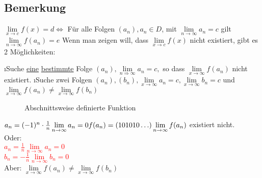 \subsection*{Bemerkung}
$\lim\limits_{x \rightarrow c} f(x) = d \Leftrightarrow$ Für alle Folgen $(a_n), a_n \in D$, mit $\lim\limits_{n \rightarrow \infty} a_n =c $ gilt $\lim\limits_{n \rightarrow \infty} f(a_n) =e $
Wenn man zeigen will, dass $\lim\limits_{x \rightarrow c} f(x)$ nicht existiert, gibt es 2 Möglichkeiten:
\begin{enumerate}[-]
\i Suche \underline{eine} \underline{bestimmte} Folge $(a_n), \lim\limits_{n \Rightarrow \infty} a_n = c,$ so dass $\lim\limits_{x \rightarrow \infty} f(a_n)$ nicht existiert.
\i Suche zwei Folgen $(a_n), (b_n), \lim\limits_{x \rightarrow \infty} a_n = c, \lim\limits_{x \rightarrow \infty} b_n = c$ und $\lim\limits_{x \rightarrow \infty} f(a_n) \not = \lim\limits_{x \rightarrow \infty} f(b_n)$
\end{enumerate}
\begin{figure*}[h!]
\centering
{}
\caption{Abschnittsweise definierte Funktion}
\end{figure*}
$a_n = (-1)^n \cdot \frac{1}{n}\\
\lim\limits_{n \rightarrow \infty} a_n = 0\\
f(a_n) = (1 0 1 0 1 0 \ldots)\\
\lim\limits_{n \rightarrow \infty} f(a_n)$ existiert nicht.\\
Oder:\\
\textcolor{red}{$a_n = \frac{1}{n}
\lim\limits_{n \rightarrow \infty} a_n = 0$}\\
\textcolor{red}{$b_n = -\frac{1}{n}
\lim\limits_{n \rightarrow \infty} b_n = 0$}\\
Aber: $\lim\limits_{x \rightarrow \infty} f(a_n) \not = \lim\limits_{x \rightarrow \infty} f(b_n)$
